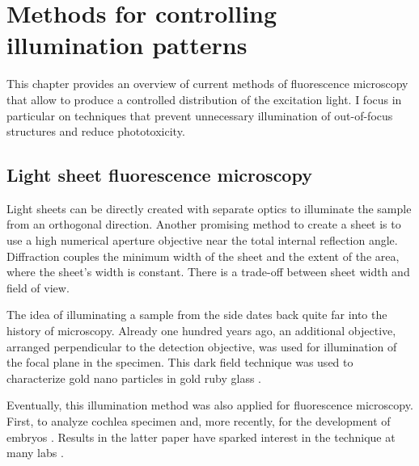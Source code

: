 
\chapter{Methods for controlling illumination patterns}
\label{sec:approaches}
%
\begin{summary}
  This chapter provides an overview of current methods of fluorescence
  microscopy that allow to produce a controlled distribution of the
  excitation light. I focus in particular on techniques that prevent
  unnecessary illumination of out-of-focus structures and reduce
  phototoxicity.
\end{summary}
\section{Light sheet fluorescence microscopy}
\label{sec:light-sheet-microscopy}
\begin{summary}
  Light sheets can be directly created with separate optics to
  illuminate the sample from an orthogonal direction. Another
  promising method to create a sheet is to use a high numerical
  aperture objective near the total internal reflection
  angle. Diffraction couples the minimum width of the sheet and the
  extent of the area, where the sheet's width is constant. There is a
  trade-off between sheet width and field of view.
\end{summary}
The idea of illuminating a sample from the side dates back quite far
into the history of microscopy. Already one hundred years ago, an
additional objective, arranged perpendicular to the detection
objective, was used for illumination of the focal plane in the
specimen. This dark field technique was used to characterize gold nano
particles in gold ruby glass \citep{Siedentopf1903}.

Eventually, this illumination method was also applied for fluorescence
microscopy. First, to analyze cochlea specimen \citep{Voie1993} and,
more recently, for the development of embryos
\citep{Huisken2004}. Results in the latter paper have sparked interest
in the technique at many labs \citep{Santi2011}.
